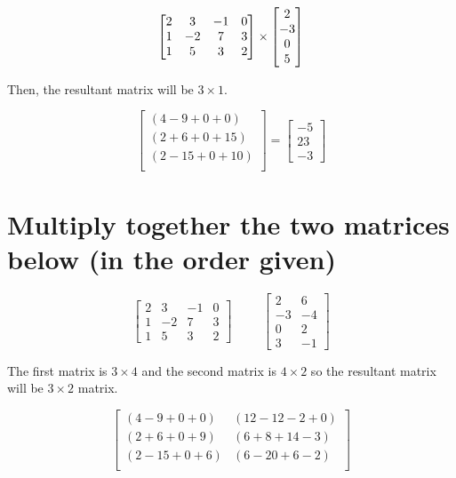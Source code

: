 \documentclass{article}
\begin{document}
\begin{equation}
  \begin{bmatrix} 2 & 3 & -1 & 0 \\ 1 & -2 & 7 & 3 \\ 1 & 5 & 3 & 2 \\ \end{bmatrix} \times \begin{bmatrix} 2 \\ -3 \\ 0 \\ 5 \\ \end{bmatrix}
\end{equation}

Then, the resultant matrix will be \(3 \times 1\).

\begin{equation}
  \begin{bmatrix}
    (4 - 9 + 0 + 0) \\
    (2 + 6 + 0 + 15) \\
    (2 - 15 + 0 + 10) \\
  \end{bmatrix}
  =
  \begin{bmatrix}
    -5 \\
    23 \\
    -3
  \end{bmatrix}
\end{equation}

\bigskip


\section{Multiply together the two matrices below (in the order given)}

\[
\begin{bmatrix}
  2 & 3& -1 & 0 \\
  1 & -2 & 7 & 3 \\
  1 & 5 & 3 & 2
\end{bmatrix}
\hspace{1cm}
\begin{bmatrix}
  2 & 6 \\
  -3 & -4 \\
  0 & 2 \\
  3 & -1
\end{bmatrix}
\]

\sol

The first matrix is \(3 \times 4\) and the second matrix is \(4 \times 2\)
so the resultant matrix will be \(3 \times 2\) matrix.

\begin{equation}
  \begin{bmatrix}
    (4 - 9 + 0 + 0) & (12 - 12 -2 + 0) \\
    (2 + 6 + 0 + 9) & (6 + 8 + 14 - 3) \\
    (2 - 15 + 0 + 6) & (6 - 20 + 6 - 2) \\
  \end{bmatrix}
\end{equation}
\end{document}
